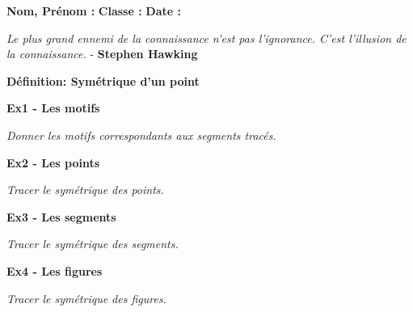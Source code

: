 



\textbf{Nom, Prénom :} \hspace{8cm} \textbf{Classe :} \hspace{3cm} \textbf{Date :}\\

\begin{center}
  \textit{Le plus grand ennemi de la connaissance n'est pas l'ignorance. C'est l'illusion de la connaissance.} - \textbf{Stephen Hawking}
\end{center}

\textbf{Définition: Symétrique d'un point} \\ \Pointilles[3]

\textbf{Ex1 - Les motifs}

\textit{Donner les motifs correspondants aux segments tracés.}

\textbf{Ex2 - Les points}

\textit{Tracer le symétrique des points.}

\textbf{Ex3 - Les segments}

\textit{Tracer le symétrique des segments.}

\textbf{Ex4 - Les figures}

\textit{Tracer le symétrique des figures.}


